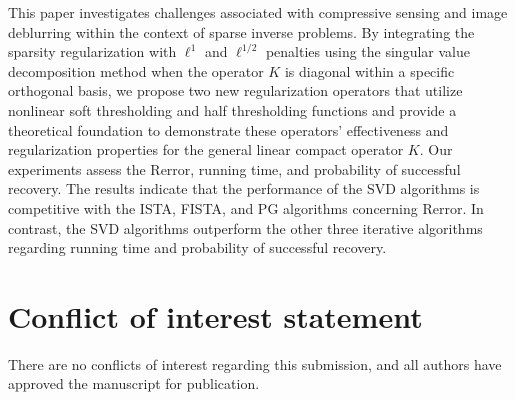 \documentclass[a4paper,12pt]{article}
\numberwithin{equation}{section}
\begin{document}
\par This paper investigates challenges associated with compressive sensing and image deblurring within the context of sparse inverse problems. By integrating the sparsity regularization with $\ell^{1}$ and $\ell^{1/2}$ penalties using the singular value decomposition method when the operator $K$ is diagonal within a specific orthogonal basis, we propose two new regularization operators that utilize nonlinear soft thresholding and half thresholding functions and provide a theoretical foundation to demonstrate these operators' effectiveness and regularization properties for the general linear compact operator $K$. Our experiments assess the Rerror, running time, and probability of successful recovery. The results indicate that the performance of the SVD algorithms is competitive with the ISTA, FISTA, and PG algorithms concerning Rerror. In contrast, the SVD algorithms outperform the other three iterative algorithms regarding running time and probability of successful recovery.

\section{Conflict of interest statement}
There are no conflicts of interest regarding this submission, and all authors have approved the manuscript for publication.
\end{document}
